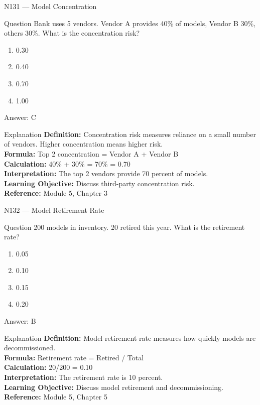 \documentclass[aspectratio=169,8pt]{beamer}
\begin{document}
	\begin{frame}{N131 --- Model Concentration}
		\begin{block}{Question}
			Bank uses 5 vendors. Vendor A provides 40\% of models, Vendor B 30\%, others 30\%. What is the concentration risk?
			\begin{enumerate}
				\item 0.30
				\item 0.40
				\item 0.70
				\item 1.00
			\end{enumerate}
		\end{block}
		\begin{exampleblock}{Answer: C}\end{exampleblock}
		\begin{block}{Explanation}
			\textbf{Definition:} Concentration risk measures reliance on a small number of vendors. Higher concentration means higher risk.\\
			\textbf{Formula:} Top 2 concentration = Vendor A + Vendor B\\
			\textbf{Calculation:} 40\% + 30\% = 70\% = 0.70\\
			\textbf{Interpretation:} The top 2 vendors provide 70 percent of models.\\
			\textbf{Learning Objective:} Discuss third-party concentration risk.\\
			\textbf{Reference:} Module 5, Chapter 3
		\end{block}
	\end{frame}
	
	\begin{frame}{N132 --- Model Retirement Rate}
		\begin{block}{Question}
			200 models in inventory. 20 retired this year. What is the retirement rate?
			\begin{enumerate}
				\item 0.05
				\item 0.10
				\item 0.15
				\item 0.20
			\end{enumerate}
		\end{block}
		\begin{exampleblock}{Answer: B}\end{exampleblock}
		\begin{block}{Explanation}
			\textbf{Definition:} Model retirement rate measures how quickly models are decommissioned.\\
			\textbf{Formula:} Retirement rate = Retired / Total\\
			\textbf{Calculation:} 20/200 = 0.10\\
			\textbf{Interpretation:} The retirement rate is 10 percent.\\
			\textbf{Learning Objective:} Discuss model retirement and decommissioning.\\
			\textbf{Reference:} Module 5, Chapter 5
		\end{block}
	\end{frame}
	
\end{document}
